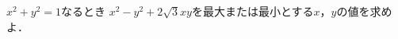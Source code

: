 \documentclass[../../main.tex]{subfiles}
\begin{document}
$x^2+y^2=1$なるとき
$x^2-y^2+2\sqrt{3}xy$を最大または最小とする$x$，$y$の値を求めよ．
\end{document}

